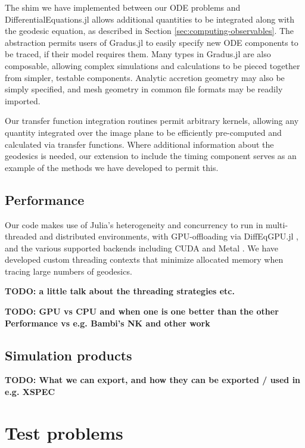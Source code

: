 \documentclass[fleqn,usenatbib]{mnras}
\newcommand{\todo}[1]{{\noindent \bf \color{red} TODO: #1}}
\newcommand{\Gradus}{Gradus.jl }
\begin{document}
The shim we have implemented between our ODE problems and DifferentialEquations.jl allows additional quantities to be integrated along with the geodesic equation, as described in Section \ref{sec:computing-observables}. The abstraction permits users of \Gradus to easily specify new ODE components to be traced, if their model requires them. Many types in \Gradus are also composable, allowing complex simulations and calculations to be pieced together from simpler, testable components. Analytic accretion geometry may also be simply specified, and mesh geometry in common file formats may be readily imported.

Our transfer function integration routines permit arbitrary kernels, allowing any quantity integrated over the image plane to be efficiently pre-computed and calculated via transfer functions. Where additional information about the geodesics is needed, our extension to include the timing component serves as an example of the methods we have developed to permit this.

\subsection{Performance}
\label{sec:performance}

Our code makes use of Julia's heterogeneity and concurrency to run in multi-threaded and distributed environments, with GPU-offloading via DiffEqGPU.jl \citep{utkarsh2023automated}, and the various supported backends including CUDA and Metal \citep{besard2018juliagpu}. We have developed custom threading contexts that minimize allocated memory when tracing large numbers of geodesics.


\todo{a little talk about the threading strategies etc.}

\todo{GPU vs CPU and when one is one better than the other
Performance vs e.g. Bambi's NK and other work}

\subsection{Simulation products}

\todo{What we can export, and how they can be exported / used in e.g. XSPEC}

\section{Test problems}
\end{document}
